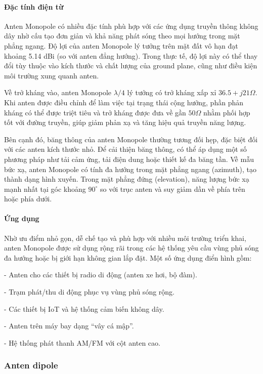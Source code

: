 \documentclass{article}
\begin{document}
	\paragraph{Đặc tính điện từ}\mbox{}
	
	Anten Monopole có nhiều đặc tính phù hợp với các ứng dụng truyền thông không dây nhờ cấu tạo đơn giản và khả năng phát sóng theo mọi hướng trong mặt phẳng ngang. Độ lợi của anten Monopole lý tưởng trên mặt đất vô hạn đạt khoảng 5.14 dBi (so với anten đẳng hướng). Trong thực tế, độ lợi này có thể thay đổi tùy thuộc vào kích thước và chất lượng của ground plane, cũng như điều kiện môi trường xung quanh anten.
	
	Về trở kháng vào, anten Monopole $\lambda/4$ lý tưởng có trở kháng xấp xỉ $36.5 + j21 \Omega$. Khi anten được điều chỉnh để làm việc tại trạng thái cộng hưởng, phần phản kháng có thể được triệt tiêu và trở kháng được đưa về gần $50\Omega$ nhằm phối hợp tốt với đường truyền, giúp giảm phản xạ và tăng hiệu quả truyền năng lượng.
	
	Bên cạnh đó, băng thông của anten Monopole thường tương đối hẹp, đặc biệt đối với các anten kích thước nhỏ. Để cải thiện băng thông, có thể áp dụng một số phương pháp như tải cảm ứng, tải điện dung hoặc thiết kế đa băng tần. Về mẫu bức xạ, anten Monopole có tính đa hướng trong mặt phẳng ngang (azimuth), tạo thành dạng hình xuyến. Trong mặt phẳng đứng (elevation), năng lượng bức xạ mạnh nhất tại góc khoảng $90^{\circ}$ so với trục anten và suy giảm dần về phía trên hoặc phía dưới.
	
	\paragraph{Ứng dụng}\mbox{}
	
	Nhờ ưu điểm nhỏ gọn, dễ chế tạo và phù hợp với nhiều môi trường triển khai, anten Monopole được sử dụng rộng rãi trong các hệ thống yêu cầu vùng phủ sóng đa hướng hoặc bị giới hạn không gian lắp đặt. Một số ứng dụng điển hình gồm:
	
	- Anten cho các thiết bị radio di động (anten xe hơi, bộ đàm).
	
	- Trạm phát/thu di động phục vụ vùng phủ sóng rộng.
	
	- Các thiết bị IoT và hệ thống cảm biến không dây.
	
	- Anten trên máy bay dạng “vây cá mập”.
	
	- Hệ thống phát thanh AM/FM với cột anten cao.
	
	\subsubsection{Anten dipole}
	
\end{document}
